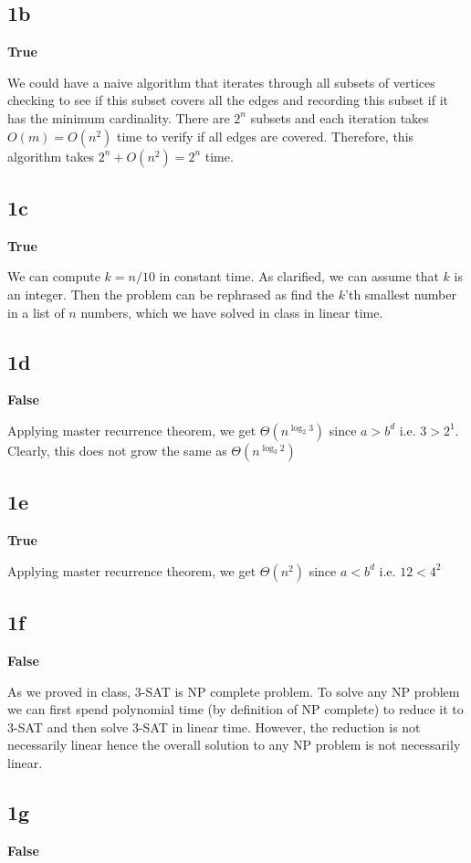 \documentclass{article}
\begin{document}
    \subsection*{1b}
    \textbf{True}

    We could have a naive algorithm that iterates through all subsets of vertices checking to see if this subset covers all the edges and recording this subset if it has the minimum cardinality. There are $2^n$ subsets and each iteration takes $O(m) = O(n^2)$ time to verify if all edges are covered. Therefore, this algorithm takes $2^n + O(n^2) = 2^n$ time.

    \subsection*{1c}
    \textbf{True}

    We can compute $k = n/10$ in constant time. As clarified, we can assume that $k$ is an integer. Then the problem can be rephrased as find the $k$'th smallest number in a list of $n$ numbers, which we have solved in class in linear time.

    \subsection*{1d}
    \textbf{False}

    Applying master recurrence theorem, we get $\Theta(n^{\log_2 3})$ since $a > b^d$ i.e. $3 > 2^1$. Clearly, this does not grow the same as $\Theta(n^{\log_3 2})$

    \subsection*{1e}
    \textbf{True}

    Applying master recurrence theorem, we get $\Theta(n^2)$ since $a < b^d$ i.e. $12 < 4^2$

    \subsection*{1f}
    \textbf{False}

    As we proved in class, 3-SAT is NP complete problem. To solve any NP problem we can first spend polynomial time (by definition of NP complete) to reduce it to 3-SAT and then solve 3-SAT in linear time. However, the reduction is not necessarily linear hence the overall solution to any NP problem is not necessarily linear.

    \subsection*{1g}
    \textbf{False}
\end{document}
